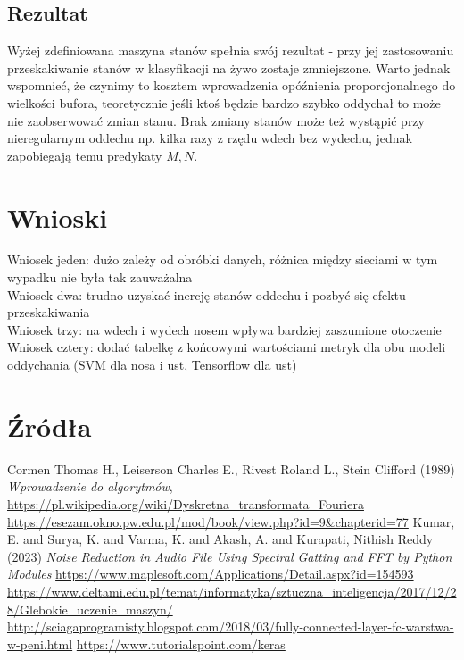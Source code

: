 \documentclass[polish]{article}
\begin{document}
\subsection{Rezultat}
Wyżej zdefiniowana maszyna stanów spełnia swój rezultat - przy jej zastosowaniu przeskakiwanie stanów w klasyfikacji na żywo zostaje zmniejszone. 
Warto jednak wspomnieć, że czynimy to kosztem wprowadzenia opóźnienia proporcjonalnego
do wielkości bufora, teoretycznie jeśli ktoś będzie bardzo szybko oddychał to może nie zaobserwować zmian stanu. Brak zmiany stanów może też wystąpić przy nieregularnym oddechu np. kilka razy z rzędu
wdech bez wydechu, jednak zapobiegają temu predykaty $M,N$. 
\section{Wnioski}
Wniosek jeden: dużo zależy od obróbki danych, różnica między sieciami w tym wypadku nie była tak zauważalna \\
Wniosek dwa: trudno uzyskać inercję stanów oddechu i pozbyć się efektu przeskakiwania \\
Wniosek trzy: na wdech i wydech nosem wpływa bardziej zaszumione otoczenie
Wniosek cztery: dodać tabelkę z końcowymi wartościami metryk dla obu modeli oddychania (SVM dla nosa i ust, Tensorflow dla ust)
\section{Źródła}
\begin{thebibliography}{2}
 Cormen Thomas H., Leiserson Charles E., Rivest Roland L., Stein Clifford (1989) \emph{Wprowadzenie do algorytmów},
\url{https://pl.wikipedia.org/wiki/Dyskretna_transformata_Fouriera}
\url{https://esezam.okno.pw.edu.pl/mod/book/view.php?id=9&chapterid=77}
Kumar, E. and Surya, K. and Varma, K. and Akash, A. and Kurapati, Nithish Reddy (2023) \emph{Noise Reduction in Audio File Using Spectral Gatting and FFT by Python Modules}
\url{https://www.maplesoft.com/Applications/Detail.aspx?id=154593}
\url{https://www.deltami.edu.pl/temat/informatyka/sztuczna_inteligencja/2017/12/28/Glebokie_uczenie_maszyn/}
\url{http://sciagaprogramisty.blogspot.com/2018/03/fully-connected-layer-fc-warstwa-w-peni.html}
\url{https://www.tutorialspoint.com/keras}
\end{thebibliography}
\end{document}
